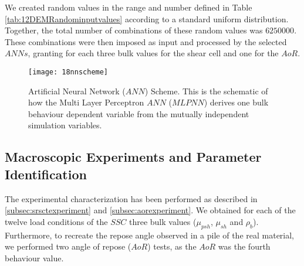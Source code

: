 \documentclass[review]{elsarticle}
\begin{document}
We created random values
in the range and number defined in Table \ref{tab:12DEMRandominputvalues}
according to a standard uniform distribution.
Together, the total number of combinations of these random values was $6250000$.
These combinations were then imposed as input and processed by the selected
$ANNs$, granting for each three bulk values for the shear
cell and one for the $AoR$.
\begin{figure}[!htb] 
\centering 
\texttt{[image: 18nnscheme]} 
\caption[ANN Scheme]{Artificial Neural Network ($ANN$) Scheme. This is the
schematic of how the Multi Layer Perceptron $ANN$ ($MLPNN$) derives one bulk
behaviour dependent variable from the mutually independent simulation variables.}
\label{fig:18nnscheme} 
\end{figure}

\subsection{Macroscopic Experiments and Parameter Identification}
\label{subsec:macroscopicexperimentsparameteridentification}
The experimental characterization has been performed as described in
\ref{subsec:srsctexperiment} and \ref{subsec:aorexperiment}. 
We obtained for each of the twelve load conditions of the $SSC$ three bulk
values ($\mu_{psh}$, $\mu_{sh}$ and $\rho_b$).
Furthermore, to recreate the repose angle observed in a pile of the real material, 
we performed two angle of repose ($AoR$) tests, as the $AoR$ was the fourth
behaviour value. 
\end{document}
